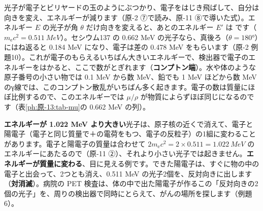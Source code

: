 光子が電子とビリヤードの玉のようにぶつかり、電子をはじき飛ばして、自分は向きを変え、エネルギーが減ります（原-2 ⑦で読み、原-11 ⑧で導いた式）。エネルギー $E$ の光子が角 $\theta$ だけ向きを変えると、あとのエネルギー $E'$ は
です（$m_{\mathrm e}c^2=\qty{0.511}{MeV}$）。セシウム137 の 0.662 MeV の光子なら、真後ろ（$\theta=\ang{180}$）にはね返ると 0.184 MeV になり、電子は差の 0.478 MeV をもらいます（原-2 例題10）。これが電子のもらえるいちばん大きいエネルギーで、検出器で電子のエネルギーをはかると、ここで数がとぎれます（\textbf{コンプトン端}）。水や体のような原子番号の小さい物では 0.1 MeV から数 MeV、鉛でも 1 MeV ほどから数 MeV のγ線では、このコンプトン散乱がいちばん多く起きます。電子の数は質量にほぼ比例するので、このエネルギーでは $\mu/\rho$ が物質によらずほぼ同じになるのです（表\ref{ph:原-13:tab-mu}の 0.662 MeV の列）。

\textbf{エネルギーが 1.022 MeV より大きい}光子は、原子核の近くで消えて、電子と陽電子（電子と同じ質量で＋の電荷をもつ、電子の反粒子）の1組に変わることがあります。電子と陽電子の質量は合わせて $2m_{\mathrm e}c^2=2\times0.511=\qty{1.022}{MeV}$ のエネルギーにあたるので（原-11 ②）、それより小さい光子では起きません。\textbf{エネルギーが質量に変わる}、目に見える例です。できた陽電子は、すぐに物の中の電子と出会って、2つとも消え、0.511 MeV の光子2個を、反対向きに出します（\textbf{対消滅}）。病院の PET 検査は、体の中で出た陽電子が作るこの「反対向きの2個の光子」を、周りの検出器で同時にとらえて、がんの場所を探します（例題6）。

